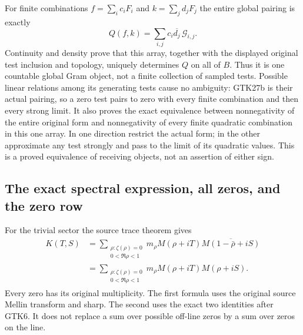 For finite combinations
$f=\sum_i c_iF_i$ and $k=\sum_j d_jF_j$ the
entire global pairing is exactly
\begin{equation}\tag{GTK27b}
 Q(f,k)=\sum_{i,j}c_i\overline{d_j}\,
                                \mathscr G_{i,j}.
\end{equation}
Continuity and density prove that this array,
together with the displayed original test
inclusion and topology, uniquely determines
$Q$ on all of $B$. Thus it is one countable
global Gram object, not a finite collection
of sampled tests. Possible linear relations
among its generating tests cause no ambiguity:
GTK27b is their actual pairing, so a zero
test pairs to zero with every finite
combination and then every strong limit.
It also proves the exact equivalence between
nonnegativity of the entire original form and
nonnegativity of every finite quadratic
combination in this one array. In one
direction restrict the actual form; in the
other approximate any test strongly and
pass to the limit of its quadratic values.
This is a proved equivalence of receiving
objects, not an assertion of either sign.

\subsection{The exact spectral expression, all zeros, and the zero row}

For the trivial sector the source trace theorem gives
\begin{equation}\tag{GTK28}
 \begin{split}
 K(T,S)
 &=\sum_{\substack{\rho:\zeta(\rho)=0\\0<\Re\rho<1}}
       m_\rho M(\rho+iT)
                 \overline{M(1-\bar\rho+iS)}\\
 &=\sum_{\substack{\rho:\zeta(\rho)=0\\0<\Re\rho<1}}
       m_\rho M(\rho+iT)M(\rho+iS).
 \end{split}
\end{equation}
Every zero has its original multiplicity. The first
formula uses the original source Mellin transform and
sharp. The second uses the exact two identities after
GTK6. It does not replace a sum over possible off-line
zeros by a sum over zeros on the line.

